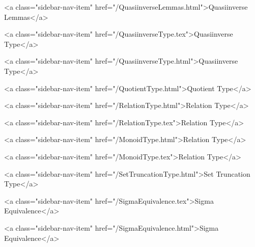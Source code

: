       
    
      
        
          <a class="sidebar-nav-item" href="/QuasiinverseLemmas.html">Quasiinverse Lemmas</a>
        
      
    
      
        
          <a class="sidebar-nav-item" href="/QuasiinverseType.tex">Quasiinverse Type</a>
        
      
    
      
        
          <a class="sidebar-nav-item" href="/QuasiinverseType.html">Quasiinverse Type</a>
        
      
    
      
        
          <a class="sidebar-nav-item" href="/QuotientType.html">Quotient Type</a>
        
      
    
      
        
          <a class="sidebar-nav-item" href="/RelationType.html">Relation Type</a>
        
      
    
      
        
          <a class="sidebar-nav-item" href="/RelationType.tex">Relation Type</a>
        
      
    
      
        
          <a class="sidebar-nav-item" href="/MonoidType.html">Relation Type</a>
        
      
    
      
        
          <a class="sidebar-nav-item" href="/MonoidType.tex">Relation Type</a>
        
      
    
      
        
          <a class="sidebar-nav-item" href="/SetTruncationType.html">Set Truncation Type</a>
        
      
    
      
        
          <a class="sidebar-nav-item" href="/SigmaEquivalence.tex">Sigma Equivalence</a>
        
      
    
      
        
          <a class="sidebar-nav-item" href="/SigmaEquivalence.html">Sigma Equivalence</a>
        
